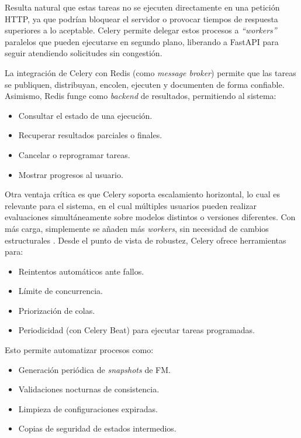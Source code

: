 Resulta natural que estas tareas no se ejecuten directamente en una petición \ac{HTTP}, 
ya que podrían bloquear el servidor o provocar tiempos de respuesta superiores 
a lo aceptable. Celery permite delegar estos procesos a \textit{``workers''} paralelos 
que pueden ejecutarse en segundo plano, liberando a FastAPI para seguir 
atendiendo solicitudes sin congestión.

La integración de Celery con Redis (como \textit{message broker}) permite que las tareas 
se publiquen, distribuyan, encolen, ejecuten y documenten de forma confiable. 
Asimismo, Redis funge como \textit{backend} de resultados, permitiendo al sistema:
\begin{itemize}
    \item Consultar el estado de una ejecución.
    
    \item Recuperar resultados parciales o finales.
    
    \item Cancelar o reprogramar tareas.
    
    \item Mostrar progresos al usuario.
\end{itemize}

Otra ventaja crítica es que Celery soporta escalamiento horizontal, lo cual es 
relevante para el sistema, en el cual múltiples usuarios pueden realizar 
evaluaciones simultáneamente sobre modelos distintos o versiones diferentes. 
Con más carga, simplemente se añaden más \textit{workers}, sin necesidad de cambios 
estructurales \citep{celery2025docs}. Desde el punto de vista de robustez, Celery ofrece 
herramientas para:
\begin{itemize}
    \item Reintentos automáticos ante fallos.
    
    \item Límite de concurrencia.
    
    \item Priorización de colas.
    
    \item Periodicidad (con Celery Beat) para ejecutar tareas programadas.
\end{itemize}

Esto permite automatizar procesos como:
\begin{itemize}
    \item Generación periódica de \textit{snapshots} de \ac{FM}.
    
    \item Validaciones nocturnas de consistencia.
    
    \item Limpieza de configuraciones expiradas.
    
    \item Copias de seguridad de estados intermedios.
\end{itemize}

